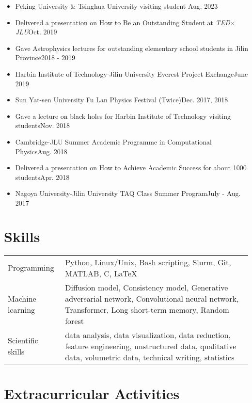 \documentclass[a4paper,12pt]{article}
\begin{document}
\begin{itemize}[leftmargin=0cm]
\setlength{\itemsep}{-5pt}
\item[] Peking University \& Tsinghua University visiting student \hfill Aug. 2023  
\item[] Delivered a presentation on How to Be an Outstanding Student at {\textit{TED$\times$JLU}}\hfill Oct. 2019
\item[] Gave Astrophysics lectures for outstanding elementary school students in Jilin Province\hfill 2018 - 2019
\item[] Harbin Institute of Technology-Jilin University Everest Project Exchange\hfill June 2019
\item[] Sun Yat-sen University Fu Lan Physics Festival (Twice)\hfill Dec. 2017, 2018
\item[] Gave a lecture on black holes for Harbin Institute of Technology visiting students\hfill Nov. 2018
\item[] Cambridge-JLU Summer Academic Programme in Computational Physics\hfill Aug. 2018
\item[] Delivered a presentation on How to Achieve Academic Success for about {1000} students\hfill Apr. 2018
\item[] Nagoya University-Jilin University TAQ Class Summer Program\hfill July - Aug. 2017
\end{itemize}
\section{Skills}
\begin{tabularx}{\linewidth}{@{}l X@{}}
Programming &  \normalsize{Python, Linux/Unix, Bash scripting, Slurm, Git, MATLAB, C, \LaTeX}\\
Machine learning &  \normalsize{Diffusion model, Consistency model, Generative adversarial network, Convolutional neural network, Transformer, Long short-term memory, Random forest}\\
Scientific skills & \normalsize{data analysis, data visualization, data reduction, feature engineering, unstructured data, qualitative data, volumetric data, technical writing, statistics}\\  
\end{tabularx}


\section{Extracurricular Activities}
\end{document}
